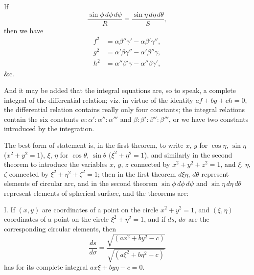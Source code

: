 \documentclass[11pt,a4paper]{book}
\begin{document}
If
\[
\frac{\sin\phi\,d\phi\,d\psi}{R}
  = \frac{\sin\eta\,d\eta\,d\theta}{S},
\]
then we have
\begin{align*}
f^2 &= \alpha\beta''\gamma' - \alpha\beta'\gamma'', \\
g^2 &= \alpha'\beta\gamma'' - \alpha'\beta''\gamma, \\
h^2 &= \alpha''\beta'\gamma - \alpha''\beta\gamma',
\end{align*}
$\&$c.

And it may be added that the integral equations are, so to speak, a complete
integral of the differential relation; viz. in virtue of the identity
$af+bg+ch=0$, the differential relation contains really only four constants;
the integral relations contain the six constants
$\alpha:\alpha':\alpha'':\alpha'''$ and $\beta:\beta':\beta'':\beta'''$, or we
have two constants introduced by the integration.

The best form of statement is, in the first theorem, to write $x$, $y$ for
$\cos\eta$, $\sin\eta$ ($x^2+y^2=1$), $\xi$, $\eta$ for $\cos\theta$,
$\sin\theta$ ($\xi^2+\eta^2=1$), and similarly in the second theorem to
introduce the variables $x$, $y$, $z$ connected by $x^2+y^2+z^2=1$, and
$\xi$, $\eta$, $\zeta$ connected by $\xi^2+\eta^2+\zeta^2=1$; then in the
first theorem $d\xi\eta$, $d\theta$ represent elements of circular arc, and
in the second theorem $\sin\phi\,d\phi\,d\psi$ and
$\sin\eta\,d\eta\,d\theta$ represent elements of spherical surface, and
the theorems are:

\medskip
\noindent\textsc{I.}\quad
If $(x,y)$ are coordinates of a point on the circle $x^2+y^2=1$, and
$(\xi,\eta)$ coordinates of a point on the circle $\xi^2+\eta^2=1$, and if
$ds$, $d\sigma$ are the corresponding circular elements, then
\[
\frac{ds}{d\sigma}
= \frac{\sqrt{(ax^2+by^2-c)}}{\sqrt{(a\xi^2+b\eta^2-c)}}
\]
has for its complete integral $ax\xi+by\eta-c=0$.
\end{document}

